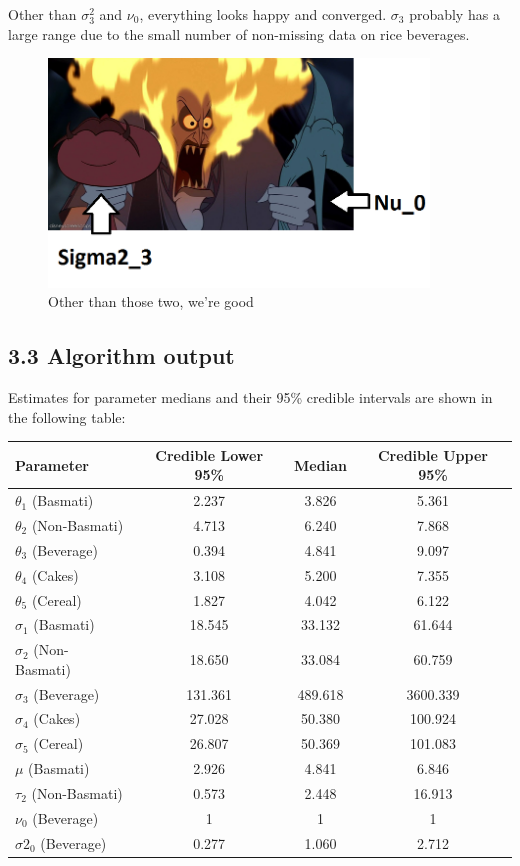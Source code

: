 \documentclass[]{article}
\begin{document}
Other than \(\sigma^2_3\) and \(\nu_0\), everything looks happy and
converged. \(\sigma_3\) probably has a large range due to the small
number of non-missing data on rice beverages.

\begin{figure}[h]
  \caption{Other than those two, we're good}
  \centering \includegraphics[width=0.9\textwidth]{hades_mad}
\end{figure}

\subsection{3.3 Algorithm output}

Estimates for parameter medians and their 95\% credible intervals are
shown in the following table:

\begin{center}
  \begin{tabular}{l c c c}
  \hline Parameter & Credible Lower 95\% & Median & Credible Upper 95\%  \\ \hline
    $\theta_1$ (Basmati) & 2.237 & 3.826 & 5.361 \\ 
    $\theta_2$ (Non-Basmati) & 4.713 & 6.240 & 7.868 \\
    $\theta_3$ (Beverage) & 0.394 & 4.841 & 9.097 \\
    $\theta_4$ (Cakes) & 3.108 & 5.200 & 7.355 \\
    $\theta_5$ (Cereal) & 1.827 & 4.042 & 6.122 \\ \hline
    $\sigma_1$ (Basmati) & 18.545 & 33.132 & 61.644 \\ 
    $\sigma_2$ (Non-Basmati) & 18.650 & 33.084 & 60.759 \\
    $\sigma_3$ (Beverage) & 131.361 & 489.618 & 3600.339 \\
    $\sigma_4$ (Cakes) & 27.028 & 50.380 & 100.924 \\
    $\sigma_5$ (Cereal) & 26.807 & 50.369 & 101.083 \\ \hline
    $\mu$ (Basmati) & 2.926 & 4.841 & 6.846 \\ 
    $\tau_2$ (Non-Basmati) & 0.573 & 2.448 & 16.913 \\
    $\nu_0$ (Beverage) & 1 & 1 & 1 \\
    $\sigma2_0$ (Beverage) & 0.277 & 1.060 & 2.712 \\ \hline
  \end{tabular}
\end{center}
\end{document}
